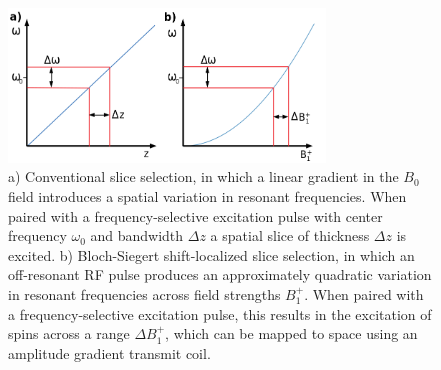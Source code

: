 
\newpage

\begin{figure}[h]
\centering
\includegraphics[width=0.75\textwidth]{figures/intro_figure.png}
\caption{a) Conventional slice selection, in which a linear gradient in the $B_0$ field introduces a spatial variation in resonant frequencies. 
When paired with a frequency-selective excitation pulse with center frequency $\omega_0$ and bandwidth $\Delta z$ a spatial slice of thickness $\Delta z$ is excited. 
b) Bloch-Siegert shift-localized slice selection, 
in which an off-resonant RF pulse produces an approximately quadratic variation in resonant frequencies across field strengths $B_1^+$. 
When paired with a frequency-selective excitation pulse, this results in the excitation of spins across a range $\Delta B_1^+$, which can be mapped to space using an amplitude gradient transmit coil.}
\label{fig:intro}
\end{figure}

